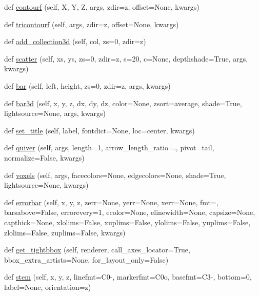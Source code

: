 \begin{DoxyCompactItemize}
\item 
def \hyperlink{classmplot3d_1_1axes3d_1_1Axes3D_a2ce6fa375e8327b859a127ab9dfc36ad}{contourf} (self, X, Y, Z, args, zdir=\textquotesingle{}z\textquotesingle{}, offset=None, kwargs)
\item 
def \hyperlink{classmplot3d_1_1axes3d_1_1Axes3D_a6c15c3a50369b4cac40bde8f134586e2}{tricontourf} (self, args, zdir=\textquotesingle{}z\textquotesingle{}, offset=None, kwargs)
\item 
def \hyperlink{classmplot3d_1_1axes3d_1_1Axes3D_a67424524d3e76a9ed82fb24c550ac4a4}{add\+\_\+collection3d} (self, col, zs=0, zdir=\textquotesingle{}z\textquotesingle{})
\item 
def \hyperlink{classmplot3d_1_1axes3d_1_1Axes3D_a916a677feb730c99ed34f7fb0c1208d9}{scatter} (self, xs, ys, zs=0, zdir=\textquotesingle{}z\textquotesingle{}, s=20, c=None, depthshade=True, args, kwargs)
\item 
def \hyperlink{classmplot3d_1_1axes3d_1_1Axes3D_a5c95436ac957d0360eaf62a49347a8f2}{bar} (self, left, height, zs=0, zdir=\textquotesingle{}z\textquotesingle{}, args, kwargs)
\item 
def \hyperlink{classmplot3d_1_1axes3d_1_1Axes3D_af64225d8a9aeca2c9b5acf4953e402c8}{bar3d} (self, x, y, z, dx, dy, dz, color=None, zsort=\textquotesingle{}average\textquotesingle{}, shade=True, lightsource=None, args, kwargs)
\item 
def \hyperlink{classmplot3d_1_1axes3d_1_1Axes3D_ac5cefc2e2da989a7d26605c6654fde86}{set\+\_\+title} (self, label, fontdict=None, loc=\textquotesingle{}center\textquotesingle{}, kwargs)
\item 
def \hyperlink{classmplot3d_1_1axes3d_1_1Axes3D_a410785cc1be6faf5eafbb44ad427a790}{quiver} (self, args, length=1, arrow\+\_\+length\+\_\+ratio=., pivot=\textquotesingle{}tail\textquotesingle{}, normalize=False, kwargs)
\item 
def \hyperlink{classmplot3d_1_1axes3d_1_1Axes3D_aa9ff1e641bb6ec66cf60f43149b74168}{voxels} (self, args, facecolors=None, edgecolors=None, shade=True, lightsource=None, kwargs)
\item 
def \hyperlink{classmplot3d_1_1axes3d_1_1Axes3D_a670f88ce517be63f226ee450d9787e12}{errorbar} (self, x, y, z, zerr=None, yerr=None, xerr=None, fmt=\textquotesingle{}\textquotesingle{}, barsabove=False, errorevery=1, ecolor=None, elinewidth=None, capsize=None, capthick=None, xlolims=False, xuplims=False, ylolims=False, yuplims=False, zlolims=False, zuplims=False, kwargs)
\item 
def \hyperlink{classmplot3d_1_1axes3d_1_1Axes3D_a0b22ad96fa54eb2b580818f22f49e84b}{get\+\_\+tightbbox} (self, renderer, call\+\_\+axes\+\_\+locator=True, bbox\+\_\+extra\+\_\+artists=None, for\+\_\+layout\+\_\+only=False)
\item 
def \hyperlink{classmplot3d_1_1axes3d_1_1Axes3D_ae54d9c8a76acf06a9da24106f4e98139}{stem} (self, x, y, z, linefmt=\textquotesingle{}C0-\/\textquotesingle{}, markerfmt=\textquotesingle{}C0o\textquotesingle{}, basefmt=\textquotesingle{}C3-\/\textquotesingle{}, bottom=0, label=None, orientation=\textquotesingle{}z\textquotesingle{})
\end{DoxyCompactItemize}
